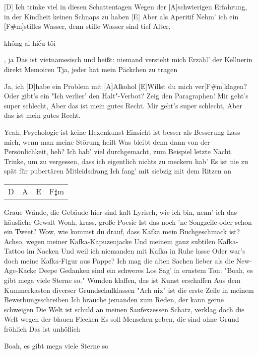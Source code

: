 



\begin{guitar}
	
	[D] Ich trinke viel in diesen Schattentagen
	Wegen der [A]schwierigen Erfahrung, in der Kindheit keinen Schnaps zu haben
	[E] Aber als Aperitif
	Nehm' ich ein [F#m]stilles Wasser, denn stille Wasser sind tief
	Alter, \begin{otherlanguage}{vietnamese}không ai hiểu tôi\end{otherlanguage}, ja
	Das ist vietnamesisch und heißt: niemand versteht mich
	Erzähl' der Kellnerin direkt Memoiren
	Tja, jeder hat mein Päckchen zu tragen
	
	Ja, ich [D]habe ein Problem mit [A]Alkohol
	[E]Willst du mich ver[F#m]klagen?
	Oder gibt's ein "Ich verlier' den Halt"\--Verbot?
	Zeig den Paragraphen!
	Mir geht's super schlecht,
	Aber das ist mein gutes Recht.
	Mir geht's super schlecht,
	Aber das ist mein gutes Recht.
	
	Yeah, Psychologie ist keine Hexenkunst
	Einsicht ist besser als Besserung
	Lass mich, wenn man meine Störung heilt
	Was bleibt denn dann von der Persönlichkeit, heh?
	Ich hab' viel durchgemacht, zum Beispiel letzte Nacht
	Trinke, um zu vergessen, dass ich eigentlich nichts zu meckern hab'
	Es ist nie zu spät für pubertären Mitleidsdrang
	Ich fang' mit siebzig mit dem Ritzen an
	
	 
	
	{\footnotesize\begin{tabular}{l|l|l|l}
			D & A & E & F$\sharp$m
	\end{tabular}}
	
	Graue Wände, die Gebäude hier sind kalt
	Lyrisch, wie ich bin, nenn' ich das häusliche Gewalt
	Woah, krass, große Poesie
	Ist das noch 'ne Songzeile oder schon ein Tweet?
	Wow, wie kommst du drauf, dass Kafka mein Buchgeschmack ist?
	Achso, wegen meiner Kafka-Kapuzenjacke
	Und meinem ganz subtilen Kafka-Tattoo im Nacken
	Und weil ich niemanden mit Kafka in Ruhe lasse
	Oder war's doch meine Kafka-Figur aus Pappe?
	Ich mag die alten Sachen lieber als die New-Age-Kacke
	Deepe Gedanken sind ein schweres Los
	Sag' in ernstem Ton: "Boah, es gibt mega viele Sterne so."
	Wunden klaffen, das ist Kunst erschaffen
	Aus dem Kummerkasten diverser Grundschulklassen
	"Ach nix" ist die erste Zeile in meinem Bewerbungsschreiben
	Ich brauche jemanden zum Reden, der kann gerne schweigen
	Die Welt ist schuld an meinen Saufexzessen
	Schatz, verklag doch die Welt wegen der blauen Flecken
	Es soll Menschen geben, die sind ohne Grund fröhlich
	Das ist unhöflich
	
	 
	
	Boah, es gibt mega viele Sterne so
\end{guitar}